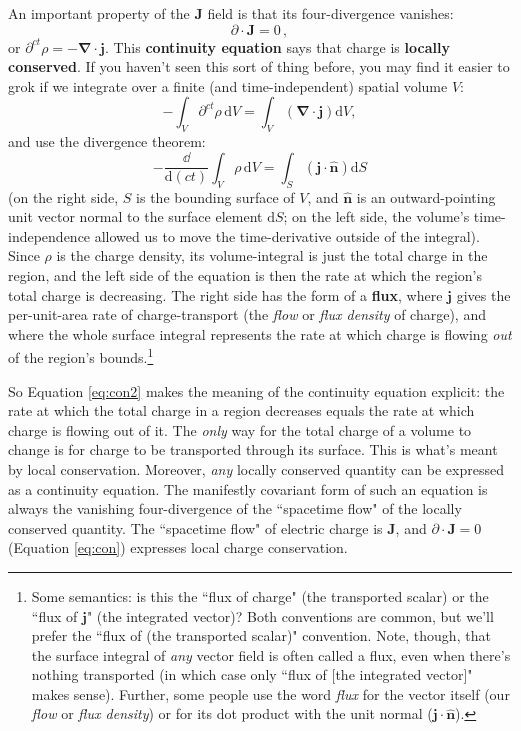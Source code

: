 \documentclass[12pt]{article}
\renewcommand{\vv}[1]{\mathbf{#1}}
\newcommand{\dd}[1]{\mathrm{d}#1}
\newcommand{\del}{\boldsymbol{\nabla}}
\begin{document}
An important property of the $\vv J$ field is that its four-divergence vanishes:
\begin{equation}\label{eq:con}
\boxed{\partialup \cdot \vv J = 0} \, ,
\end{equation}
or $\partial^{ct} \rho = - \del \cdot \vv j$. This \textbf{continuity equation} says that charge is \textbf{locally conserved}. If you haven't seen this sort of thing before, you may find it easier to grok if we integrate over a finite (and time-independent) spatial volume $V$:
\begin{equation*}
- \int_V \partial^{ct} \rho \, \dd V = \int_V \left( \del \cdot \vv j \right) \dd V ,
\end{equation*}
and use the divergence theorem:
\begin{equation}\label{eq:con2}
- \dfrac{\dd}{\dd (ct)} \int_V \rho \, \dd V = \int_S \left( \vv j \cdot \vv{\hat{n}} \right) \dd S
\end{equation}
(on the right side, $S$ is the bounding surface of $V$, and $\vv{\hat{n}}$ is an outward-pointing unit vector normal to the surface element $\dd S$; on the left side, the volume's time-independence allowed us to move the time-derivative outside of the integral). Since $\rho$ is the charge density, its volume-integral is just the total charge in the region, and the left side of the equation is then the rate at which the region's total charge is decreasing. The right side has the form of a \textbf{flux}, where $\vv j$ gives the per-unit-area rate of charge-transport (the \emph{flow} or \emph{flux density} of charge), and where the whole surface integral represents the rate at which charge is flowing \emph{out} of the region's bounds.\footnote{\label{fn:flux}Some semantics: is this the ``flux of charge" (the transported scalar) or the ``flux of $\vv j$" (the integrated vector)? Both conventions are common, but we'll prefer the ``flux of (the transported scalar)" convention. Note, though, that the surface integral of \emph{any} vector field is often called a flux, even when there's nothing transported (in which case only ``flux of [the integrated vector]" makes sense). Further, some people use the word \emph{flux} for the vector itself (our \emph{flow} or \emph{flux density}) or for its dot product with the unit normal ($\vv j \cdot \vv{\hat{n}}$).}

So Equation \ref{eq:con2} makes the meaning of the continuity equation explicit: the rate at which the total charge in a region decreases equals the rate at which charge is flowing out of it. The \emph{only} way for the total charge of a volume to change is for charge to be transported through its surface. This is what's meant by local conservation. Moreover, \emph{any} locally conserved quantity can be expressed as a continuity equation. The manifestly covariant form of such an equation is always the vanishing four-divergence of the ``spacetime flow" of the locally conserved quantity. The ``spacetime flow" of electric charge is $\vv J$, and $\partialup \cdot \vv J =  0$ (Equation \ref{eq:con}) expresses local charge conservation.
\end{document}
